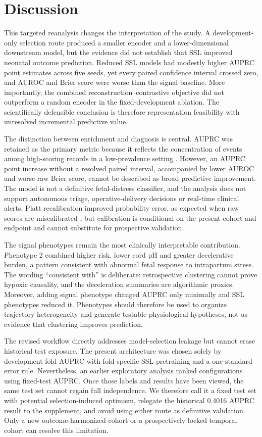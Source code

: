 \documentclass[utf8]{FrontiersinHarvard}
\begin{document}
\section{Discussion}

This targeted reanalysis changes the interpretation of the study. A development-only selection route produced a smaller encoder and a lower-dimensional downstream model, but the evidence did not establish that SSL improved neonatal outcome prediction. Reduced SSL models had modestly higher AUPRC point estimates across five seeds, yet every paired confidence interval crossed zero, and AUROC and Brier score were worse than the signal baseline. More importantly, the combined reconstruction--contrastive objective did not outperform a random encoder in the fixed-development ablation. The scientifically defensible conclusion is therefore representation feasibility with unresolved incremental predictive value.

The distinction between enrichment and diagnosis is central. AUPRC was retained as the primary metric because it reflects the concentration of events among high-scoring records in a low-prevalence setting \citep{davis2006}. However, an AUPRC point increase without a resolved paired interval, accompanied by lower AUROC and worse raw Brier score, cannot be described as broad predictive improvement. The model is not a definitive fetal-distress classifier, and the analysis does not support autonomous triage, operative-delivery decisions or real-time clinical alerts. Platt recalibration improved probability error, as expected when raw scores are miscalibrated \citep{vanCalster2019}, but calibration is conditional on the present cohort and endpoint and cannot substitute for prospective validation.

The signal phenotypes remain the most clinically interpretable contribution. Phenotype 2 combined higher risk, lower cord pH and greater decelerative burden, a pattern consistent with abnormal fetal response to intrapartum stress. The wording ``consistent with'' is deliberate: retrospective clustering cannot prove hypoxic causality, and the deceleration summaries are algorithmic proxies. Moreover, adding signal phenotype changed AUPRC only minimally and SSL phenotypes reduced it. Phenotypes should therefore be used to organize trajectory heterogeneity and generate testable physiological hypotheses, not as evidence that clustering improves prediction.

The revised workflow directly addresses model-selection leakage but cannot erase historical test exposure. The present architecture was chosen solely by development-fold AUPRC with fold-specific SSL pretraining and a one-standard-error rule. Nevertheless, an earlier exploratory analysis ranked configurations using fixed-test AUPRC. Once those labels and results have been viewed, the same test set cannot regain full independence. We therefore call it a fixed test set with potential selection-induced optimism, relegate the historical 0.4016 AUPRC result to the supplement, and avoid using either route as definitive validation. Only a new outcome-harmonized cohort or a prospectively locked temporal cohort can resolve this limitation.
\end{document}
